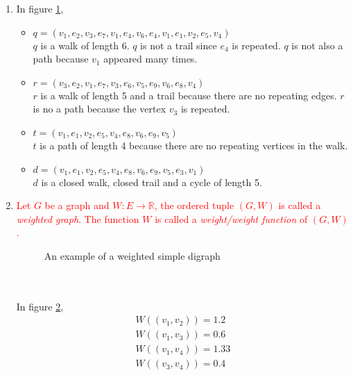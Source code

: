 \begin{enumerate}
\begin{figure}[h!]
\label{walkfig}
\end{figure}
\item[] In figure \ref{walkfig},
\begin{itemize}
\item $q=(v_1,e_2,v_3,e_7,v_1,e_4,v_6,e_4,v_1,e_1,v_2,e_5,v_4)$\\ $q$ is a walk of length 6. $q$ is not a trail since $e_4$ is repeated. $q$ is not also a path because $v_1$ appeared many times.
\item $r=(v_3,e_2,v_1,e_7,v_3,e_6,v_5,e_9,v_6,e_8,v_4)$ \\ $r$ is a walk of length 5 and a trail because there are no repeating edges. $r$ is no a path because the vertex $v_3$ is repeated.
\item $t=(v_1,e_1,v_2,e_5,v_4,e_8,v_6,e_9,v_5)$ \\ $t$ is a path of length 4 because there are no repeating vertices in the walk.
\item $d=(v_1,e_1,v_2,e_5,v_4,e_8,v_6,e_9,v_5,e_3,v_1)$ \\ $d$ is a closed walk, closed trail and a cycle of length 5.
\end{itemize}
\item \textcolor{red}{Let $G$ be a graph and $W: E \rightarrow \mathbb{R}$, the ordered tuple $(G,W)$ is called a \textit{weighted graph}. The function $W$ is called a \textit{weight/weight function} of $(G,W)$.}
\begin{figure}[h!]
	\centering
{}
		\caption{An example of a weighted simple digraph}
		\label{wgraph}
	\end{figure}
\\ \\In figure \ref{wgraph},
	\begin{equation}
		\begin{array}{c}
			W((v_1,v_2))=1.2\\
			W((v_1,v_3))=0.6\\
			W((v_1,v_4))=1.33\\
			W((v_3,v_4))=0.4
		\end{array}
	\end{equation}
\end{enumerate}

